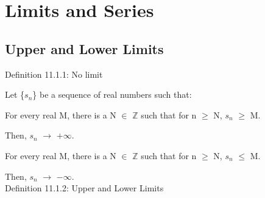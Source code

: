 \newpage

\section[Day 11: Limits \& Series]{Limits and Series}

\subsection{ Upper and Lower Limits } 

{ \color{blue} Definition 11.1.1: No limit } 

	\begin{adjustbox}{minipage=14cm, right, vspace=0.1cm 0cm}
		Let \{$s_n$\} be a sequence of real numbers such that:

		\hspace{1cm}
		For every real M, there is a N $\in$ $\mathbb{Z}$ such that
		for n $\geq$ N, $s_n$ $\geq$ M.

		\hspace{2cm}
		Then, $s_n$ $\rightarrow$ $+\infty$.

		\hspace{1cm}
		For every real M, there is a N $\in$ $\mathbb{Z}$ such that
		for n $\geq$ N, $s_n$ $\leq$ M.

		\hspace{2cm}
		Then, $s_n$ $\rightarrow$ $-\infty$. \\
	\end{adjustbox}

{ \color{blue} Definition 11.1.2: Upper and Lower Limits } 

